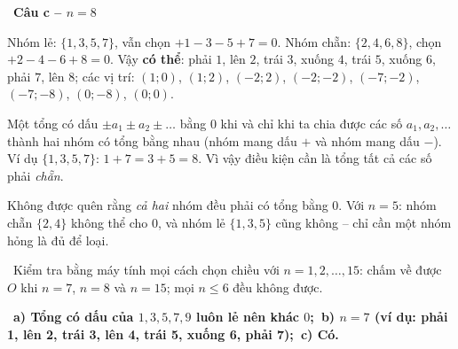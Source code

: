 \documentclass[11pt]{article}
\providecommand{\AnsWord}{Đáp số}
\newcommand{\ans}[1]{\par\smallskip{\bfseries\color{tmGreen!88!black}\AnsWord:}\ {\bfseries\color{AnsRed}#1}\par}
\newcommand{\step}[2]{\par\smallskip\noindent{\bfseries\color{tmBlue!85!black}\StepWord~#1.}\ {\bfseries #2}\par\nopagebreak}
\newcommand{\verify}[1]{\par\smallskip\noindent{\bfseries\color{tmGreen!80!black}\faCheckCircle\ \CheckWord}\ #1\par}
\def\AnsWord{Đáp số}
\def\StepWord{Bước}
\def\CheckWord{Thử lại:}
\begin{document}
{\step{4}{Câu c -- $n=8$}
Nhóm lẻ: $\{1,3,5,7\}$, vẫn chọn $+1-3-5+7=0$. Nhóm chẵn: $\{2,4,6,8\}$, chọn $+2-4-6+8=0$. Vậy \textbf{có thể}: phải $1$, lên $2$, trái $3$, xuống $4$, trái $5$, xuống $6$, phải $7$, lên $8$; các vị trí: $(1;0)$, $(1;2)$, $(-2;2)$, $(-2;-2)$, $(-7;-2)$, $(-7;-8)$, $(0;-8)$, $(0;0)$.
\begin{proofbox}Một tổng có dấu $\pm a_1\pm a_2\pm\dots$ bằng $0$ khi và chỉ khi ta chia được các số $a_1,a_2,\dots$ thành hai nhóm có tổng bằng nhau (nhóm mang dấu $+$ và nhóm mang dấu $-$). Ví dụ $\{1,3,5,7\}$: $1+7=3+5=8$. Vì vậy điều kiện cần là tổng tất cả các số phải \emph{chẵn}.\end{proofbox}
\begin{warnbox}Không được quên rằng \emph{cả hai} nhóm đều phải có tổng bằng $0$. Với $n=5$: nhóm chẵn $\{2,4\}$ không thể cho $0$, và nhóm lẻ $\{1,3,5\}$ cũng không -- chỉ cần một nhóm hỏng là đủ để loại.\end{warnbox}
\verify{Kiểm tra bằng máy tính mọi cách chọn chiều với $n=1,2,\dots,15$: chấm về được $O$ khi $n=7$, $n=8$ và $n=15$; mọi $n\le 6$ đều không được.}
\ans{a) Tổng có dấu của $1,3,5,7,9$ luôn lẻ nên khác $0$;\ b) $n=7$ (ví dụ: phải 1, lên 2, trái 3, lên 4, trái 5, xuống 6, phải 7);\ c) Có.}
}
\end{document}
